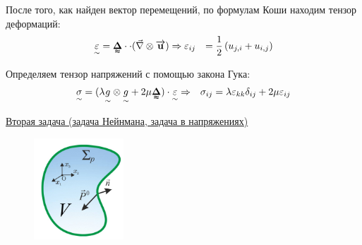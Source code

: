  
После того, как найден вектор перемещений, по формулам Коши находим тензор деформаций:
$$
\begin{aligned}
\underset{\sim}{\varepsilon} & =\tenq{\Delta} \cdot\cdot(\vec{\nabla} \otimes \overrightarrow{\mathbf{u}}) \Rightarrow
\varepsilon_{i j} & =\frac{1}{2}\left(u_{j, i}+u_{i, j}\right)
\end{aligned}
$$


Определяем тензор напряжений с помощью закона Гука:
$$
\begin{aligned}
& \underset{\sim}{\sigma}=(\lambda \underset{\sim}{g} \otimes \underset{\sim}{g}+2 \mu \tenq{\Delta}) \cdot \underset{\sim}{\varepsilon} \Rightarrow
& \sigma_{i j}=\lambda \varepsilon_{k k} \delta_{i j}+2 \mu \varepsilon_{i j}
\end{aligned}
$$


\underline{Вторая задача (задача Нейнмана, задача в напряжениях)}

\begin{figure}[h!]
  \centering
  \includegraphics[width=0.3\textwidth]{images/13.3.jpg}
\end{figure}




